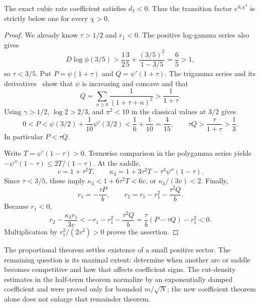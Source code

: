 \begin{proposition}
\label{moderate:prop:cubic-negative}
The exact cubic rate coefficient satisfies $d_3<0$.
Thus the transition factor $e^{d_3\chi^3}$ is strictly below one
for every $\chi>0$.
\end{proposition}
\begin{proof}
We already know $\tau>1/2$ and $r_1<0$. The positive log-gamma
series also gives
\[
 D\log\phi(3/5)>
 \frac12\frac35+\frac{(3/5)^2}{1-3/5}
 =\frac65>1,
\]
so $\tau<3/5$. Put $P=\psi(1+\tau)$ and
$Q=\psi'(1+\tau)$. The trigamma series and its
derivatives~\cite{moderate:DLMF} show that $\psi$ is increasing
and concave and that
\[
 Q=\sum_{n\ge0}\frac1{(1+\tau+n)^2}>
       \frac1{1+\tau}.
\]
Using $\gamma>1/2$, $\log2>2/3$, and $\pi^2<10$ in the
classical values at $3/2$ gives
\[
 0<P<\psi(3/2)+\frac1{10}\psi'(3/2)
       <\frac16+\frac1{10}=\frac4{15},
 \qquad
 \tau Q>\frac{\tau}{1+\tau}>\frac13.
\]
In particular $P<\tau Q$.

Write $T=\psi'(1-\tau)>0$. Termwise comparison in the
polygamma series yields
$-\psi''(1-\tau)\le2T/(1-\tau)$. At the saddle,
\[
 v=1+\tau^2T,\qquad
 \kappa_3=1+3\tau^2T-\tau^3\psi''(1-\tau).
\]
Since $\tau<3/5$, these imply
$\kappa_3<1+6\tau^2T<6v$, or $\kappa_3/(3v)<2$.
Finally,
\[
 r_1=-\frac{\tau P}{b},\qquad
 r_2=r_1-r_1^2-\frac{\tau^2Q}{b}.
\]
Because $r_1<0$,
\[
 r_2-\frac{\kappa_3r_1}{3v}
 <-r_1-r_1^2-\frac{\tau^2Q}{b}
 =\frac{\tau}{b}(P-\tau Q)-r_1^2<0.
\]
Multiplication by $r_1^2/(2v^2)>0$ proves the assertion.
\end{proof}

The proportional theorem settles existence of a small positive sector.
The remaining question is its maximal extent: determine when another
arc or saddle becomes competitive and how that affects coefficient
signs. The cut-density estimates in the half-term theorem normalize by
an exponentially damped coefficient and were proved only for bounded
$m/\sqrt N$; the new coefficient theorem alone does not enlarge that
remainder theorem.
